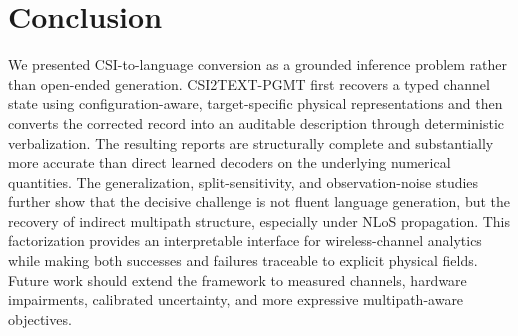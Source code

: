\section{Conclusion}

We presented CSI-to-language conversion as a grounded inference problem rather than open-ended
generation. CSI2TEXT-PGMT first recovers a typed channel state using configuration-aware,
target-specific physical representations and then converts the corrected record into an auditable
description through deterministic verbalization. The resulting reports are structurally complete and
substantially more accurate than direct learned decoders on the underlying numerical quantities. The
generalization, split-sensitivity, and observation-noise studies further show that the decisive challenge
is not fluent language generation, but the recovery of indirect multipath structure, especially under
NLoS propagation. This factorization provides an interpretable interface for wireless-channel
analytics while making both successes and failures traceable to explicit physical fields. Future work
should extend the framework to measured channels, hardware impairments, calibrated uncertainty, and
more expressive multipath-aware objectives.

